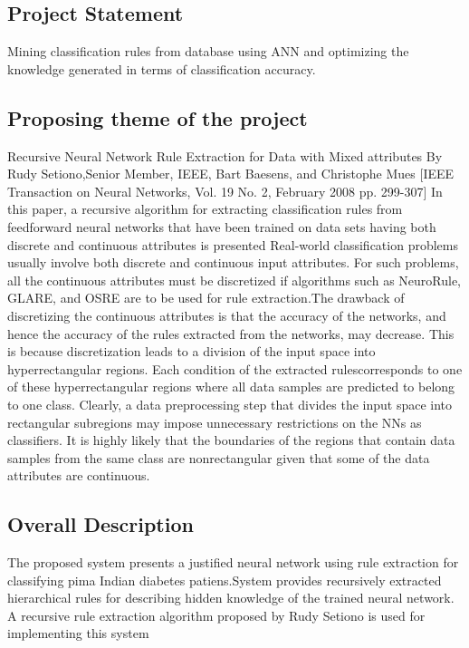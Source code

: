 \documentclass[a4paper,14pt,onecolumn]{article}
\begin{document}
\subsection{Project Statement}
 Mining classification rules from database using ANN and optimizing the knowledge generated in terms of classification accuracy.\\

 \subsection{Proposing theme of the project}
Recursive Neural Network Rule Extraction for Data with Mixed attributes By Rudy Setiono,Senior Member, IEEE, Bart Baesens, and Christophe Mues [IEEE Transaction on Neural Networks, Vol. 19 No. 2, February 2008 pp. 299-307]
In this paper, a recursive algorithm for extracting classification rules from feedforward neural networks that have been trained on data sets having both discrete and continuous attributes is presented Real-world classification problems usually involve both discrete and continuous input attributes. For such problems, all the continuous attributes must be discretized if algorithms such as NeuroRule, GLARE, and OSRE are to be used for rule extraction.The drawback of discretizing the continuous attributes is that the accuracy of the networks, and hence the accuracy of the rules extracted from the networks, may decrease. This is because discretization leads to a division of the input space into hyperrectangular regions. Each condition of the extracted rulescorresponds to one of these hyperrectangular regions where all data samples are predicted to belong to one class. Clearly, a data preprocessing step that divides the input space into rectangular subregions may impose unnecessary restrictions on the NNs as classifiers. It is highly likely that the boundaries of the regions that contain data samples from the same class are nonrectangular given that some of the data attributes are continuous.\\

\subsection{Overall Description}
The proposed system presents a justified neural network using rule extraction for classifying pima Indian diabetes patiens.System provides recursively extracted hierarchical rules for describing hidden knowledge of the trained neural network.
A recursive rule extraction algorithm proposed by Rudy Setiono is used for implementing this system
\end{document}

